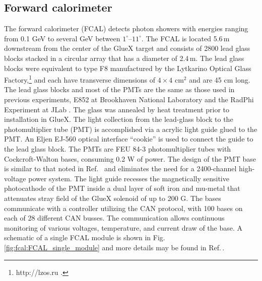 \subsection{Forward calorimeter \label{sec:fcal}}
The forward calorimeter (FCAL) detects photon showers with energies ranging from 0.1 GeV to several GeV between $1^{\circ}$--$11^{\circ}$. The FCAL is located 5.6\,m downstream from the center of the GlueX target and consists of 2800 lead glass blocks stacked in a circular array that has a diameter of 2.4\,m.  The lead glass blocks were equivalent to type F8 manufactured by the Lytkarino Optical Glass Factory,\footnote{http://lzos.ru .} and each have transverse dimensions of $4\times4$ cm$^2$ and are 45 cm long. The lead glass blocks and most of the PMTs are the same as those used in previous experiments, E852 at Brookhaven National Laboratory 
\cite{CRITTENDEN1997377} and the RadPhi Experiment at JLab \cite{JONES2007384}. The glass was annealed by heat treatment prior to installation in GlueX. 
The light collection from the lead-glass block to the photomultiplier tube (PMT) is accomplished via a acrylic light guide glued to the PMT. An Eljen EJ-560 optical interface ``cookie'' is used to connect the guide to the lead glass block. 
The PMTs are FEU 84-3 photomultiplier tubes with Cockcroft-Walton bases, consuming 0.2 W of power.  The design of the PMT base is similar to that noted in Ref.~\cite{BRUNNER1998466}
and eliminates the need for a 2400-channel high-voltage power system. The light guide recesses the magnetically sensitive photocathode of the PMT inside a dual layer of soft iron and mu-metal that attenuates stray field of the GlueX solenoid of up to 200 G. The bases communicate with a controller utilizing the CAN protocol, with 100 bases on each of 28 different CAN busses.  The communication allows continuous monitoring of various voltages, temperature, and current draw of the base.
A schematic of a single FCAL module is shown in 
Fig.\,\ref{fig:fcal:FCAL_single_module} and more details may be found in Ref.\,\cite{MORIYA201360}.


